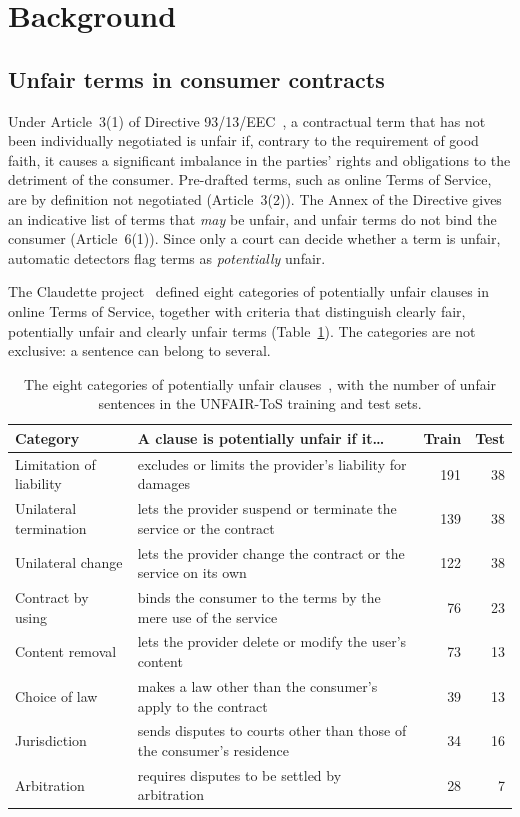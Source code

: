 \section{Background}
\label{sec:background}

\subsection{Unfair terms in consumer contracts}

Under Article~3(1) of Directive 93/13/EEC~\citep{dir93}, a contractual term that has not been individually negotiated is unfair if, contrary to the requirement of good faith, it causes a significant imbalance in the parties' rights and obligations to the detriment of the consumer. Pre-drafted terms, such as online Terms of Service, are by definition not negotiated (Article~3(2)). The Annex of the Directive gives an indicative list of terms that \emph{may} be unfair, and unfair terms do not bind the consumer (Article~6(1)). Since only a court can decide whether a term is unfair, automatic detectors flag terms as \emph{potentially} unfair.

The Claudette project~\citep{lippi2019claudette} defined eight categories of potentially unfair clauses in online Terms of Service, together with criteria that distinguish clearly fair, potentially unfair and clearly unfair terms (Table~\ref{tab:categories}). The categories are not exclusive: a sentence can belong to several.

\begin{table}[ht]
\centering\small
\caption{The eight categories of potentially unfair clauses~\citep{lippi2019claudette}, with the number of unfair sentences in the UNFAIR-ToS training and test sets.}
\label{tab:categories}
\begin{tabularx}{\textwidth}{@{}p{3.3cm}X rr@{}}
\toprule
Category & A clause is potentially unfair if it\ldots & Train & Test \\
\midrule
Limitation of liability & excludes or limits the provider's liability for damages & 191 & 38 \\
Unilateral termination & lets the provider suspend or terminate the service or the contract & 139 & 38 \\
Unilateral change & lets the provider change the contract or the service on its own & 122 & 38 \\
Contract by using & binds the consumer to the terms by the mere use of the service & 76 & 23 \\
Content removal & lets the provider delete or modify the user's content & 73 & 13 \\
Choice of law & makes a law other than the consumer's apply to the contract & 39 & 13 \\
Jurisdiction & sends disputes to courts other than those of the consumer's residence & 34 & 16 \\
Arbitration & requires disputes to be settled by arbitration & 28 & 7 \\
\bottomrule
\end{tabularx}
\end{table}

